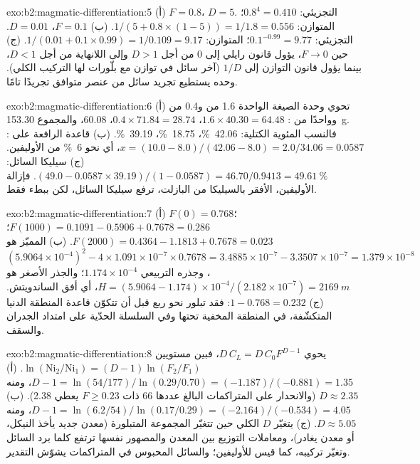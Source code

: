 \begin{solution}{exo:b2:magmatic-differentiation:5}
(أ) $F = 0.8$، $D = 5$. التجزيئي: $0.8^{4} = 0.410$؛ المتوازن:
$1/(5 + 0.8\times(1 - 5)) = 1/1.8 = 0.556$. (ب) $F = 0.1$، $D = 0.01$. التجزيئي:
$0.1^{-0.99} = 9.77$؛ المتوازن: $1/(0.01 + 0.1\times0.99) = 1/0.109 = 9.17$.
(ج) حين $F \to 0$، يؤول قانون رايلي إلى $0$ من أجل $D > 1$ وإلى اللانهاية من أجل
$D < 1$، بينما يؤول قانون التوازن إلى $1/D$ (آخر سائل في توازن
مع بلّورات لها التركيب الكلي).  وحده يستطيع تجريد
سائل من عنصر متوافق تجريدًا تامًا.
\end{solution}

\begin{solution}{exo:b2:magmatic-differentiation:6}
(أ) تحوي وحدة الصيغة الواحدة 1.6 من  و0.4 من  وواحدًا من : $1.6\times
40.30 = 64.48$، $0.4\times71.84 = 28.74$، 60.08، والمجموع \qty{153.30}{g}. فالنسب
المئوية الكتلية:  \qty{42.06}{\percent}،  \qty{18.75}{\percent}،
 \qty{39.19}{\percent}. (ب) قاعدة الرافعة على : $x = (10.0 - 8.0)/(42.06
- 8.0) = 2.0/34.06 = 0.0587$، أي نحو \qty{6}{\percent} من الأوليفين. (ج) سيليكا
السائل: $(49.0 - 0.0587\times39.19)/(1 - 0.0587) = 46.70/0.9413 =
\qty{49.61}{\percent}$. فإزالة الأوليفين، الأفقر بالسيليكا من البازلت، ترفع
سيليكا السائل، لكن ببطء فقط.
\end{solution}

\begin{solution}{exo:b2:magmatic-differentiation:7}
(أ) $F(0) = 0.768$؛ $F(1000) = 0.1091 - 0.5906 + 0.7678 = 0.286$؛ $F(2000) = 0.4364
- 1.1813 + 0.7678 = 0.023$. (ب) المميّز هو $(5.9064\times10^{-4})^2 -
4\times1.091\times10^{-7}\times0.7678 = 3.4885\times10^{-7} - 3.3507\times10^{-7} =
1.379\times10^{-8}$، وجذره التربيعي $1.174\times10^{-4}$؛ والجذر الأصغر هو
$H = (5.9064 - 1.174)\times10^{-4}/(2.182\times10^{-7}) = \qty{2169}{m}$، أي
أفق الساندويتش. (ج) $1 - 0.768 = 0.232$: فقد تبلور نحو ربع 
قبل أن تتكوّن قاعدة المنطقة الدنيا المتكشّفة، في المنطقة المخفية
تحتها وفي السلسلة الحدّية على امتداد الجدران والسقف.
\end{solution}

\begin{solution}{exo:b2:magmatic-differentiation:8}
يحوي  $D\,C_L = D\,C_0F^{D-1}$، فبين مستويين
$\ln(\mathrm{Ni}_2/\mathrm{Ni}_1) = (D - 1)\ln(F_2/F_1)$. (أ) $D - 1 = \ln(54/177)/
\ln(0.29/0.70) = (-1.187)/(-0.881) = 1.35$، ومنه $D \approx 2.35$ (والانحدار على
المتراكمات البالغ عددها 66 ذات $F \ge 0.23$ يعطي 2.38). (ب) $D - 1 = \ln(6.2/54)/\ln(0.17/0.29) = (-2.164)/(-0.534)
= 4.05$، ومنه $D \approx 5.05$. (ج) يتغيّر $D$ الكلي حين تتغيّر المجموعة
المتبلورة (معدن جديد يأخذ النيكل، أو معدن يغادر)،
ومعاملات التوزيع بين المعدن والمصهور نفسها ترتفع كلما برد السائل وتغيّر
تركيبه، كما قيس للأوليفين؛ والسائل المحبوس في المتراكمات يشوّش
التقدير.
\end{solution}

